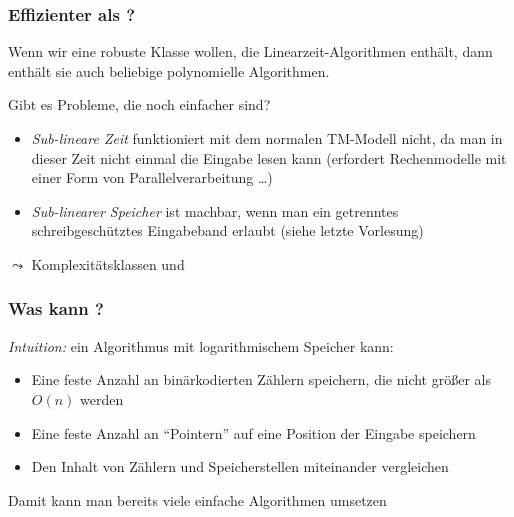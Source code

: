 \documentclass[aspectratio=1610,onlymath]{beamer}
\begin{document}
\begin{frame}\frametitle{Effizienter als ?}

Wenn wir eine robuste Klasse wollen, die Linearzeit-Algorithmen enthält, dann enthält sie auch beliebige polynomielle Algorithmen.\bigskip

\alert{Gibt es Probleme, die noch einfacher sind?}
\smallskip\pause

\begin{itemize}
\item \emph{Sub-lineare Zeit} funktioniert mit dem normalen TM-Modell nicht, da man
in dieser Zeit nicht einmal die Eingabe lesen kann {\tiny (erfordert Rechenmodelle mit einer Form von Parallelverarbeitung \ldots)}
\item \emph{Sub-linearer Speicher} ist machbar, wenn man ein getrenntes schreibgeschütztes Eingabeband erlaubt (siehe letzte Vorlesung)
\end{itemize}
$\leadsto$ Komplexitätsklassen  und 

\end{frame}

\begin{frame}\frametitle{Was kann ?}

\emph{Intuition:} ein Algorithmus mit logarithmischem Speicher kann:
\begin{itemize}
\item Eine feste Anzahl an binärkodierten Zählern speichern, die nicht größer als $O(n)$ werden
\item Eine feste Anzahl an "`Pointern"' auf eine Position der Eingabe speichern
\item Den Inhalt von Zählern und Speicherstellen miteinander vergleichen
\end{itemize}

Damit kann man bereits viele einfache Algorithmen umsetzen\pause


\end{frame}
\end{document}
